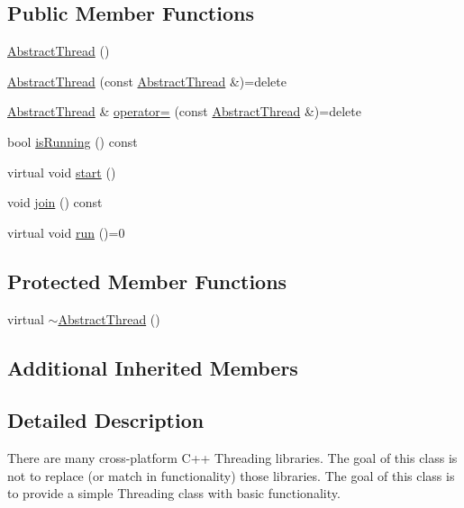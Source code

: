 \subsection*{Public Member Functions}
\begin{DoxyCompactItemize}
\item 
\hyperlink{classlog4cplus_1_1thread_1_1AbstractThread_a22f5a0c5a44609886f1c42331b34bb29}{Abstract\-Thread} ()
\item 
\hyperlink{classlog4cplus_1_1thread_1_1AbstractThread_ae47be1fb293b51c3249feec8d24d0963}{Abstract\-Thread} (const \hyperlink{classlog4cplus_1_1thread_1_1AbstractThread}{Abstract\-Thread} \&)=delete
\item 
\hyperlink{classlog4cplus_1_1thread_1_1AbstractThread}{Abstract\-Thread} \& \hyperlink{classlog4cplus_1_1thread_1_1AbstractThread_aca172f95f784af5c5efb27c51298c73a}{operator=} (const \hyperlink{classlog4cplus_1_1thread_1_1AbstractThread}{Abstract\-Thread} \&)=delete
\item 
bool \hyperlink{classlog4cplus_1_1thread_1_1AbstractThread_aada9303305eddc4c0f80081e80cb7db7}{is\-Running} () const 
\item 
virtual void \hyperlink{classlog4cplus_1_1thread_1_1AbstractThread_a37650cc367951e2c424254f3968f8349}{start} ()
\item 
void \hyperlink{classlog4cplus_1_1thread_1_1AbstractThread_a99b675802f48422f34783c88346de949}{join} () const 
\item 
virtual void \hyperlink{classlog4cplus_1_1thread_1_1AbstractThread_ae5648c74ce21204d012849ca281b10b4}{run} ()=0
\end{DoxyCompactItemize}
\subsection*{Protected Member Functions}
\begin{DoxyCompactItemize}
\item 
virtual \hyperlink{classlog4cplus_1_1thread_1_1AbstractThread_a4199b7599176d086fcfa764cef264b10}{$\sim$\-Abstract\-Thread} ()
\end{DoxyCompactItemize}
\subsection*{Additional Inherited Members}


\subsection{Detailed Description}
There are many cross-\/platform C++ Threading libraries. The goal of this class is not to replace (or match in functionality) those libraries. The goal of this class is to provide a simple Threading class with basic functionality. 


